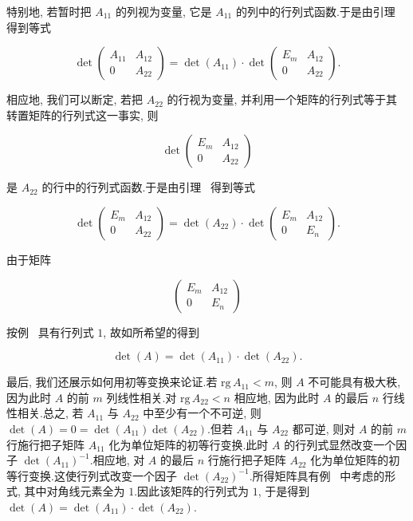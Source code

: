 \begin{bsp}
特别地, 若暂时把 $A_{11}$ 的列视为变量, 它是 $A_{11}$ 的列中的行列式函数.于是由引理~ 得到等式

\[
\det \begin{pmatrix} A_{11} & A_{12} \\ 0 & A_{22} \end{pmatrix} = \det(A_{11}) \cdot \det \begin{pmatrix} E_m & A_{12} \\ 0 & A_{22} \end{pmatrix}.
\]

相应地, 我们可以断定, 若把 $A_{22}$ 的行视为变量, 并利用一个矩阵的行列式等于其转置矩阵的行列式这一事实, 则

\[
\det \begin{pmatrix} E_m & A_{12} \\ 0 & A_{22} \end{pmatrix}
\]

是 $A_{22}$ 的行中的行列式函数.于是由引理~ 得到等式

\[
\det \begin{pmatrix} E_m & A_{12} \\ 0 & A_{22} \end{pmatrix} = \det(A_{22}) \cdot \det \begin{pmatrix} E_m & A_{12} \\ 0 & E_n \end{pmatrix}.
\]

由于矩阵

\[
\begin{pmatrix} E_m & A_{12} \\ 0 & E_n \end{pmatrix}
\]

按例~ 具有行列式 $1$, 故如所希望的得到

\[
\det(A) = \det(A_{11}) \cdot \det(A_{22}).
\]

最后, 我们还展示如何用初等变换来论证.若 $\mathrm{rg}\, A_{11} < m$, 则 $A$ 不可能具有极大秩, 因为此时 $A$ 的前 $m$ 列线性相关.对 $\mathrm{rg}\, A_{22} < n$ 相应地, 因为此时 $A$ 的最后 $n$ 行线性相关.总之, 若 $A_{11}$ 与 $A_{22}$ 中至少有一个不可逆, 则 $\det(A) = 0 = \det(A_{11}) \det(A_{22})$.但若 $A_{11}$ 与 $A_{22}$ 都可逆, 则对 $A$ 的前 $m$ 行施行把子矩阵 $A_{11}$ 化为单位矩阵的初等行变换.此时 $A$ 的行列式显然改变一个因子 $\det(A_{11})^{-1}$.相应地, 对 $A$ 的最后 $n$ 行施行把子矩阵 $A_{22}$ 化为单位矩阵的初等行变换.这使行列式改变一个因子 $\det(A_{22})^{-1}$.所得矩阵具有例~ 中考虑的形式, 其中对角线元素全为 $1$.因此该矩阵的行列式为 $1$, 于是得到 $\det(A) = \det(A_{11}) \cdot \det(A_{22})$.
\end{bsp}


